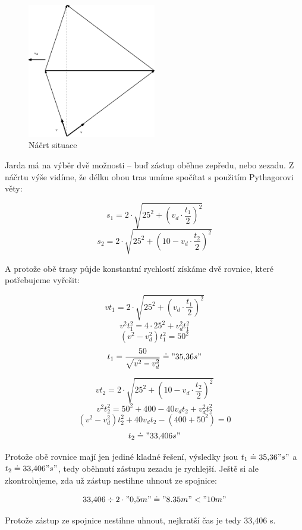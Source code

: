 \documentclass{fkssolpub}
\author{Ondřej Sedláček}
\begin{document}
\begin{figure}[h!]
	\begin{center}
		\includegraphics[width=0.5\textwidth]{3-fig.eps}
	\end{center}
	\caption{Náčrt situace}
	\label{fig:1}
\end{figure}

Jarda má na výběr dvě možnosti -- buď zástup oběhne zepředu, nebo zezadu. Z náčrtu výše vidíme, že délku obou tras umíme spočítat s použitím Pythagorovi věty:

\[
	s_1 = 2 \cdot \sqrt{25^2 + \left(v_d \cdot \frac{t_1}{2}\right)^2}
\]
\[
	s_2 = 2 \cdot \sqrt{25^2 + \left(10 - v_d \cdot \frac{t_2}{2}\right)^2}
\]

A protože obě trasy půjde konstantní rychlostí získáme dvě rovnice, které potřebujeme vyřešit:

\[
	v t_1 = 2 \cdot \sqrt{25^2 + \left(v_d \cdot \frac{t_1}{2}\right)^2}
\]
\[
	v^2 t_1^2 = 4 \cdot 25^2 + v_d^2 t_1^2
\]
\[
	(v^2 - v_d^2) t_1^2 = 50^2
\]
\[
	t_1 = \frac{50}{\sqrt{v^2 - v_d^2}} \doteq "35{,}36 s"
\]

\[
	v t_2 = 2 \cdot \sqrt{25^2 + \left(10 - v_d \cdot \frac{t_2}{2}\right)^2}
\]
\[
	v^2 t_2^2 = 50^2 + 400 - 40v_d t_2 + v_d^2 t_2^2
\]
\[
	(v^2 - v_d^2) t_2^2 + 40 v_d t_2 - (400 + 50^2) = 0
\]
\[
	t_2 \doteq "33{,}406 s"
\]

Protože obě rovnice mají jen jediné kladné řešení, výsledky jsou $t_1 \doteq 35{,}36 "s"$ a $t_2 \doteq 33{,}406 "s"$, tedy oběhnutí zástupu zezadu je rychlejší. Ještě si ale zkontrolujeme, zda už zástup nestihne uhnout ze spojnice:

\[
	33{,}406 \div 2 \cdot "0{,}5 m" \doteq "8.35 m" < "10 m"
\]

Protože zástup ze spojnice nestihne uhnout, nejkratší čas je tedy 33{,}406 s.
\end{document}
